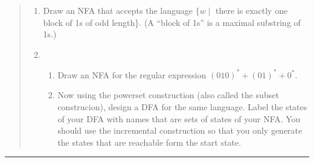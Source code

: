 \documentclass[11pt]{article}
\begin{document}



\begin{quote}
    \begin{enumerate}
        \item Draw an NFA that accepts the language $\{w \mid$ there is exactly one  block of 1s of odd length\}.  (A ``block of 1s'' is a maximal substring of 1s.)
        \item
            \begin{enumerate}
                \item Draw an NFA for the regular expression $(010)^* + (01)^* + 0^*$.
                \item Now using the powerset construction (also called the subset
                    construcion), design a DFA for the same language.  Label the states
                    of your DFA with names that are sets of states of your NFA. You
                    should use the incremental construction so that you only generate
                    the states that are reachable form the start state.
            \end{enumerate}
    \end{enumerate}
\end{quote}
\hrule
\end{document}
